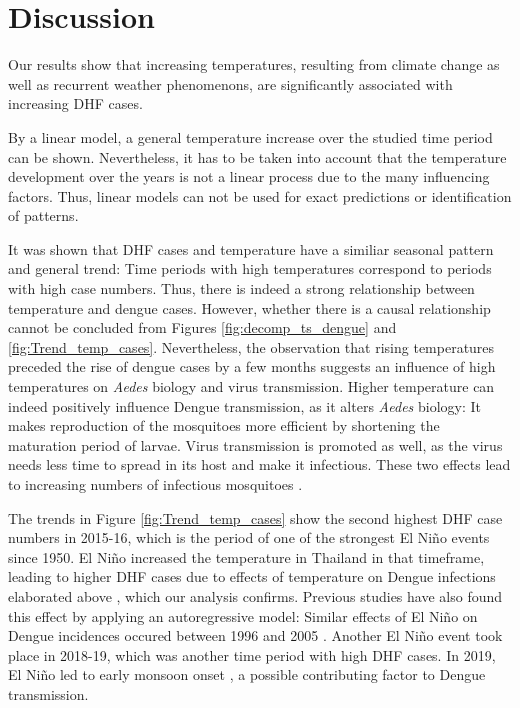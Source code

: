 \section{Discussion}
Our results show that increasing temperatures, resulting from climate change as well as recurrent weather phenomenons, are significantly associated with increasing DHF cases.

By a linear model, a general temperature increase over the studied time period can be shown. Nevertheless, it has to be taken into account that the temperature development over the years is not a linear process due to the many influencing factors. Thus, linear models can not be used for exact predictions or identification of patterns. 

It was shown that DHF cases and temperature have a similiar seasonal pattern and general trend: Time periods with high temperatures correspond to periods with high case numbers. Thus, there is indeed a strong relationship between temperature and dengue cases. However, whether there is a causal relationship cannot be concluded from Figures \ref{fig:decomp_ts_dengue} and \ref{fig:Trend_temp_cases}. Nevertheless, the observation that rising temperatures preceded the rise of dengue cases by a few months suggests an influence of high temperatures on \emph{Aedes} biology and virus transmission. 
Higher temperature can indeed positively influence Dengue transmission, as it alters \emph{Aedes} biology: It makes reproduction of the mosquitoes more efficient by shortening the maturation period of  larvae. Virus transmission is promoted as well, as the virus needs less time to spread in its host and make it infectious. These two effects lead to increasing numbers of infectious mosquitoes \citep{Anyamba2019}.
 
The trends in Figure \ref{fig:Trend_temp_cases} show the second highest DHF case numbers in 2015-16, which is the period of one of the strongest El Niño events since 1950. El Niño increased the temperature in Thailand in that timeframe, leading to higher DHF cases due to effects of temperature on Dengue infections elaborated above \citep{Anyamba2019}, which our analysis confirms. Previous studies have also found this effect by applying an autoregressive model: Similar effects of El Niño on Dengue incidences occured between 1996 and 2005 \citep{Tipayamongkholgul2009}.
Another El Niño event took place in 2018-19, which was another time period with high DHF cases.  In 2019, El Niño led to early monsoon onset \citep{Hu2020}, a possible contributing factor to Dengue transmission. 

